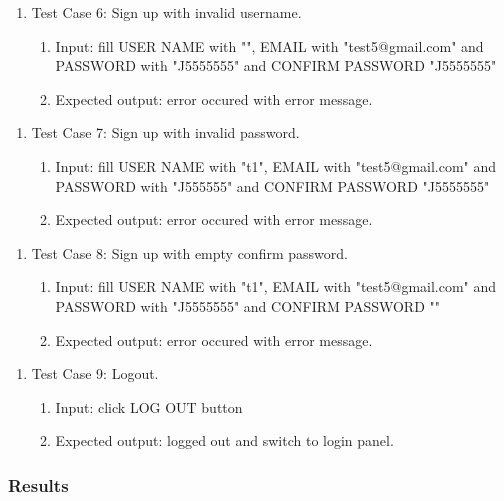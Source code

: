 \documentclass[11pt]{article}
\begin{document}
    \begin{enumerate}
        \item Test Case 6: Sign up with invalid username.
        \begin{enumerate}
            \item  Input: fill USER NAME with "", EMAIL with "test5@gmail.com" and PASSWORD with "J5555555" and CONFIRM PASSWORD "J5555555"
            \item  Expected output: error occured with error message.
        \end{enumerate}
    \end{enumerate}
    \begin{enumerate}
        \item Test Case 7: Sign up with invalid password.
        \begin{enumerate}
            \item  Input: fill USER NAME with "t1", EMAIL with "test5@gmail.com" and PASSWORD with "J555555" and CONFIRM PASSWORD "J5555555"
            \item  Expected output: error occured with error message.
        \end{enumerate}
    \end{enumerate}
    \begin{enumerate}
        \item Test Case 8: Sign up with empty confirm password.
        \begin{enumerate}
            \item  Input: fill USER NAME with "t1", EMAIL with "test5@gmail.com" and PASSWORD with "J5555555" and CONFIRM PASSWORD ""
            \item  Expected output: error occured with error message.
        \end{enumerate}
    \end{enumerate}
    \begin{enumerate}
        \item Test Case 9: Logout.
        \begin{enumerate}
            \item  Input: click LOG OUT button
            \item  Expected output: logged out and switch to login panel.
        \end{enumerate}
    \end{enumerate}
    
    \subsubsection*{Results}
\end{document}
